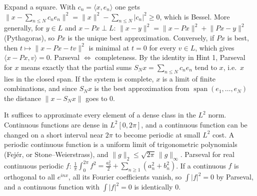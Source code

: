 \documentclass[11pt,a4paper]{article}
\begin{document}

Expand a square. With \(c_n=\langle x,e_n\rangle\) one gets \(\bigl\lVert x-\sum_{n\le N}c_ne_n\bigr\rVert^2=\lVert x\rVert^2-\sum_{n\le N}\lvert c_n\rvert^2\ge0\), which is Bessel. More generally, for \(y\in L\) and \(x-Px\perp L\): \(\lVert x-y\rVert^2=\lVert x-Px\rVert^2+\lVert Px-y\rVert^2\) (Pythagoras), so \(Px\) is the unique best approximation. Conversely, if \(Px\) is best, then \(t\mapsto\lVert x-Px-tv\rVert^2\) is minimal at \(t=0\) for every \(v\in L\), which gives \(\langle x-Px,v\rangle=0\).
Parseval \(\Leftrightarrow\) completeness. By the identity in Hint 1, Parseval for \(x\) means exactly that the partial sums \(S_Nx=\sum_{n\le N}c_ne_n\) tend to \(x\), i.e.~\(x\) lies in the closed span. If the system is complete, \(x\) is a limit of finite combinations, and since \(S_Nx\) is the best approximation from \(\operatorname{span}(e_1,\dots,e_N)\) the distance \(\lVert x-S_Nx\rVert\) goes to \(0\).

It suffices to approximate every element of a dense class in the \(L^2\) norm. Continuous functions are dense in \(L^2[0,2\pi]\), and a continuous function can be changed on a short interval near \(2\pi\) to become periodic at small \(L^2\) cost. A periodic continuous function is a uniform limit of trigonometric polynomials (Fejér, or Stone--Weierstrass), and \(\lVert g\rVert_2\le\sqrt{2\pi}\,\lVert g\rVert_\infty\).
Parseval for real continuous periodic \(f\): \(\frac1\pi\int_0^{2\pi}f^2=\frac{a_0^2}2+\sum_{n\ge1}(a_n^2+b_n^2)\). If a continuous \(f\) is orthogonal to all \(e^{inx}\), all its Fourier coefficients vanish, so \(\int\lvert f\rvert^2=0\) by Parseval, and a continuous function with \(\int\lvert f\rvert^2=0\) is identically \(0\).
\end{document}
